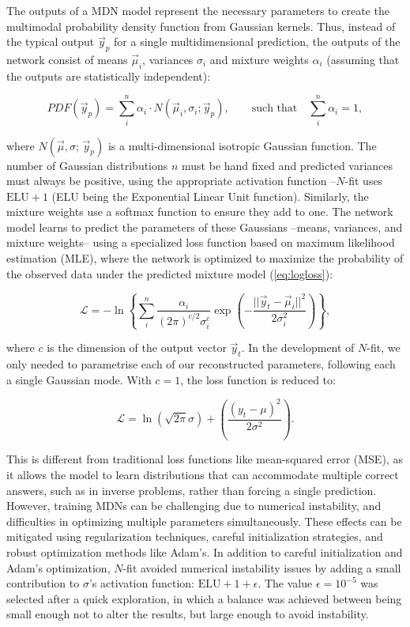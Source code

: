 The outputs of a MDN model represent the necessary parameters to create the multimodal probability density function from Gaussian kernels. Thus, instead of the typical output $\vec{y}_{p}$ for a single multidimensional prediction, the outputs of the network consist of means $\vec{\mu}_i$, variances $\sigma_i$ and mixture weights $\alpha_i$ (assuming that the outputs are statistically independent):

\begin{equation}
	PDF(\vec{y}_p) = \sum_i^n \alpha_i \cdot N(\vec{\mu}_i, \sigma_i; \vec{y}_p), \quad \quad \text{such that} \quad \sum_i^n \alpha_i = 1,
\end{equation}

where $N(\vec{\mu}, \sigma;\, \vec{y}_p)$ is a multi-dimensional isotropic Gaussian function. The number of Gaussian distributions $n$ must be hand fixed and predicted variances must always be positive, using the appropriate activation function --$N$-fit uses $\text{ELU}+1$ (ELU being the Exponential Linear Unit function). Similarly, the mixture weights use a softmax function to ensure they add to one. The network model learns to predict the parameters of these Gaussians --means, variances, and mixture weights-- using a specialized loss function based on maximum likelihood estimation (MLE), where the network is optimized to maximize the probability of the observed data under the predicted mixture model (\ref{eq:logloss}):

\begin{equation}
	\label{eq:logloss}
	\mathcal{L} = -\ln \left\{ \sum_i^n  \frac{\alpha_i}{(2\pi)^{c/2}\sigma_i^c}\exp\left( -\frac{||\vec{y}_t-\vec{\mu}_i||^2}{2\sigma_i^2} \right) \right\},
\end{equation}

where $c$ is the dimension of the output vector $\vec{y}_t$. In the development of $N$-fit, we only needed to parametrise each of our reconstructed parameters, following each a single Gaussian mode. With $c=1$, the loss function is reduced to:%

\begin{equation}
	\label{eq:loglossfinal}
	\mathcal{L} = \ln(\sqrt{2\pi}\sigma) + \left( \frac{(y_t-\mu)^2}{2\sigma^2} \right).
\end{equation}

This is different from traditional loss functions like mean-squared error (MSE), as it allows the model to learn distributions that can accommodate multiple correct answers, such as in inverse problems, rather than forcing a single prediction. However, training MDNs can be challenging due to numerical instability, and difficulties in optimizing multiple parameters simultaneously. These effects can be mitigated using regularization techniques, careful initialization strategies, and robust optimization methods like Adam's. In addition to careful initialization and Adam's optimization, $N$-fit avoided numerical instability issues by adding a small contribution to $\sigma$'s activation function: $\text{ELU}+1+\epsilon$. The value $\epsilon = 10^{-5}$ was selected after a quick exploration, in which a balance was achieved between being small enough not to alter the results, but large enough to avoid instability.

